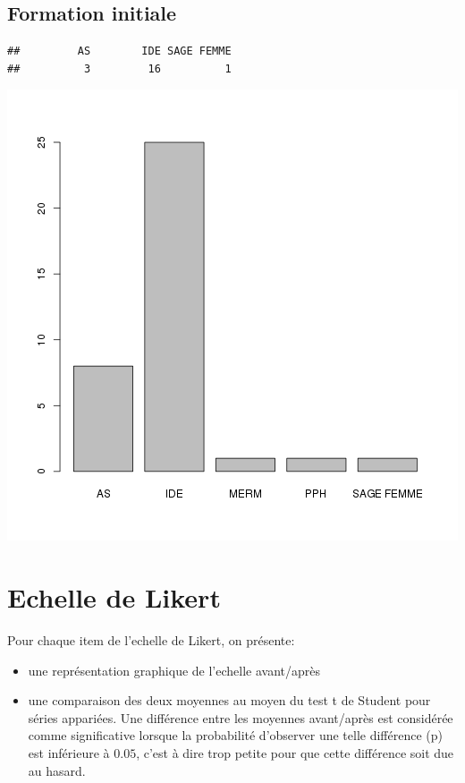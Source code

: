 \documentclass[12pt,english,french]{article}\usepackage{graphicx, color}
\makeatletter
\def\maxwidth{ %
  \ifdim\Gin@nat@width>\linewidth
    \linewidth
  \else
    \Gin@nat@width
  \fi
}
\newenvironment{kframe}{%
 \def\at@end@of@kframe{}%
 \ifinner\ifhmode%
  \def\at@end@of@kframe{\end{minipage}}%
  \begin{minipage}{\columnwidth}%
 \fi\fi%
 \def\FrameCommand##1{\hskip\@totalleftmargin \hskip-\fboxsep
 \colorbox{shadecolor}{##1}\hskip-\fboxsep
     \hskip-\linewidth \hskip-\@totalleftmargin \hskip\columnwidth}%
 \MakeFramed {\advance\hsize-\width
   \@totalleftmargin\z@ \linewidth\hsize
   \@setminipage}}%
 {\par\unskip\endMakeFramed%
 \at@end@of@kframe}
\newenvironment{knitrout}{}{} %
\makeatother
\begin{document}
\subsection{Formation initiale}
\begin{knitrout}
\color{fgcolor}\begin{kframe}
\begin{verbatim}
##         AS        IDE SAGE FEMME 
##          3         16          1
\end{verbatim}
\end{kframe}
\includegraphics[width=\maxwidth]{../figure/unnamed-chunk-4} 

\end{knitrout}



\section{Echelle de Likert}

Pour chaque item de l'echelle de Likert, on présente:
\begin{itemize}
  \item une représentation graphique de l'echelle avant/après
  \item une comparaison des deux moyennes au moyen du test t de Student pour séries appariées. Une différence entre les moyennes avant/après est considérée comme significative lorsque la probabilité d'observer une telle différence (p) est inférieure à $0.05$, c'est à dire trop petite pour que cette différence soit due au hasard.
\end{itemize}
\end{document}
